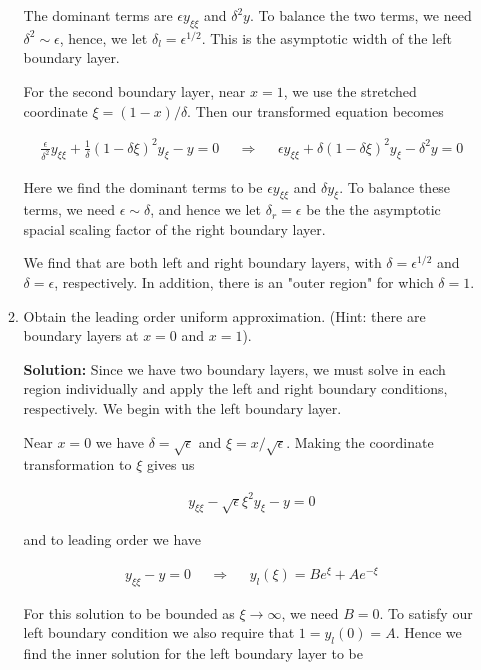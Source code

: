 \documentclass[12pt, a4paper]{article}
\begin{document}
\begin{enumerate}
\begin{enumerate}
        The dominant terms are $\epsilon y_{\xi \xi}$ and $\delta^2 y$. To balance the two terms, we need $\delta^2 \sim \epsilon$, hence, we let $\delta_l = \epsilon^{1/2}$. This is the asymptotic width of the left boundary layer. 

        For the second boundary layer, near $x=1$, we use the stretched coordinate $\xi = (1-x)/\delta$. Then our transformed equation becomes 

        \begin{align*}
            \frac{\epsilon}{\delta^2} y_{\xi\xi} + \frac{1}{\delta} (1- \delta \xi)^2 y_\xi - y = 0 && \Rightarrow && \epsilon y_{\xi\xi} + \delta (1-\delta \xi)^2 y_\xi - \delta^2 y = 0
        \end{align*}

        Here we find the dominant terms to be $\epsilon y_{\xi\xi}$ and $\delta y_\xi$. To balance these terms, we need $\epsilon \sim \delta$, and hence we let $\delta_r = \epsilon$ be the the asymptotic spacial scaling factor of the right boundary layer. 

        We find that are both left and right boundary layers, with $\delta = \epsilon^{1/2}$ and $\delta= \epsilon$, respectively. In addition, there is an "outer region" for which $\delta =1$. 

        \item Obtain the leading order uniform approximation. (Hint: there are boundary layers at $x=0$ and $x=1$).

        \textbf{Solution:} Since we have two boundary layers, we must solve in each region individually and apply the left and right boundary conditions, respectively. We begin with the left boundary layer.

        Near $x=0$ we have $\delta = \sqrt \epsilon$ and $\xi = x/\sqrt \epsilon$. Making the coordinate transformation to $\xi$ gives us

        \begin{align*}
            y_{\xi\xi} - \sqrt \epsilon \xi^2 y_\xi - y = 0
        \end{align*}

        and to leading order we have

        \begin{align*}
            y_{\xi\xi} - y = 0 && \Rightarrow &&  y_l(\xi) = B e^{\xi} + A e^{-\xi}
        \end{align*}

        For this solution to be bounded as $\xi\rightarrow \infty$, we need $B = 0$. To satisfy our left boundary condition we also require that $1=y_l(0) = A$. Hence we find the inner solution for the left boundary layer to be 


\end{enumerate}
\end{enumerate}
\end{document}
